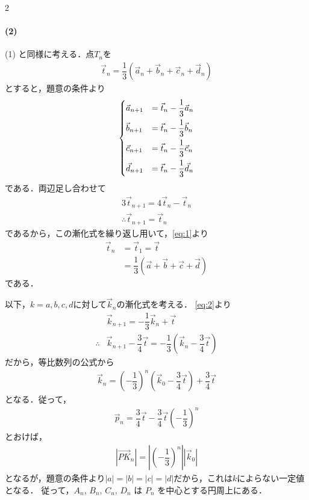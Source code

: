 \documentclass[../../main.tex]{subfiles}
\begin{document}
\begin{multicols}{2}
  \paragraph{(2)}
  (1) と同様に考える．点$T_n$を
  \begin{align}
    \vec{t}_n = \dfrac{1}{3}(\vec{a}_n + \vec{b}_n + \vec{c}_n + \vec{d}_n)
  \end{align}
  とすると，題意の条件より
  \begin{align}
    \begin{dcases}
      \vec{a}_{n+1} & = \vec{t}_n - \dfrac{1}{3}\vec{a}_n \\
      \vec{b}_{n+1} & = \vec{t}_n - \dfrac{1}{3}\vec{b}_n \\
      \vec{c}_{n+1} & = \vec{t}_n - \dfrac{1}{3}\vec{c}_n \\
      \vec{d}_{n+1} & = \vec{t}_n - \dfrac{1}{3}\vec{d}_n
    \end{dcases} \label{eq:2}
  \end{align}
  である．両辺足し合わせて
  \begin{align}
    3\vec{t}_{n+1} = 4\vec{t}_n-\vec{t}_n \\
    \therefore
    \vec{t}_{n+1} = \vec{t}_n
  \end{align}
  であるから，この漸化式を繰り返し用いて，\cref{eq:1}より
  \begin{align}
    \vec{t}_n
    & = \vec{t}_1 = \vec{t}                                           \\
    & = \dfrac{1}{3}\left(\vec{a} + \vec{b} + \vec{c} + \vec{d}\right)
  \end{align}
  である．

  以下，$k=a,b,c,d$に対して$\vec{k}_n$の漸化式を考える．
  \cref{eq:2}より
  \begin{align}
    & \vec{k}_{n+1}                        = -\dfrac{1}{3}\vec{k}_n + \vec{t}             \\
    \therefore
    & \vec{k}_{n+1} - \dfrac{3}{4}\vec{t} = -\dfrac{1}{3} (\vec{k}_n - \dfrac{3}{4}\vec{t})
  \end{align}
  だから，等比数列の公式から
  \begin{align}
    \vec{k}_n = \left(-\dfrac{1}{3}\right)^n \left(\vec{k}_0 - \dfrac{3}{4}\vec{t}\right) + \dfrac{3}{4}\vec{t}
  \end{align}
  となる．従って，
  \begin{align}
    \vec{p}_n = \dfrac{3}{4}\vec{t} - \dfrac{3}{4}\vec{t} \left(-\dfrac{1}{3}\right)^n \label{eq:3}
  \end{align}
  とおけば，
  \begin{align}
    |\overrightarrow{PK}_n| = \left|\left(-\dfrac{1}{3}\right)^n\right| |\vec{k}_0|
  \end{align}
  となるが，題意の条件より$|a|=|b|=|c|=|d|$だから，これは$k$によらない一定値となる．
  従って，$A_n$, $B_n$, $C_n$, $D_n$ は $P_n$ を中心とする円周上にある．


\end{multicols}
\end{document}

